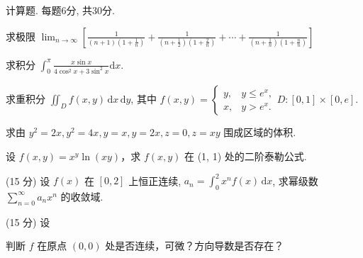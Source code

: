 \par{}
计算题. 每题6分, 共30分.\par
求极限  $\lim_{n\to\infty}\left[\frac{1}{(n+1)(1+\frac{1}{n})}+\frac{1}{(n+\frac{1}{2})(1+\frac{2}{n})}+\cdots+\frac{1}{(n+\frac{1}{n})(1+\frac{n}{n})}\right]$\par
求积分 $\int_0^\pi \frac{x\sin x}{4\cos^2x + 3\sin^2x}\mathrm{d}x.$\par
求重积分 $\iint_{D} f(x, y) \, \mathrm{d}x \, \mathrm{d}y$, 其中 $f(x, y) = \begin{cases} y, & y \leq e^x, \\ x, & y > e^x. \end{cases}$$D: [0,1] \times [0,e]$.\par
求由 $y^{2} = 2x, y^{2} = 4x, y = x, y = 2x, z = 0, z = xy$ 围成区域的体积.\par
设 $f(x, y) = x^y \ln(xy)$，求 $f(x, y)$ 在 (1, 1) 处的二阶泰勒公式.\par
\par{}
(15 分) 设 $f(x)$ 在 $[0,2]$ 上恒正连续, $a_{n} = \int_{0}^{2} x^{n} f(x) \, \mathrm{d}x$, 求幂级数 $\sum_{n=0}^{\infty} a_{n} x^{n}$ 的收敛域.\par
\par{}
\par{}
(15 分) 设\par
\nopagebreak[4]
判断 $f$ 在原点 $(0,0)$ 处是否连续，可微？方向导数是否存在？\par
$$
